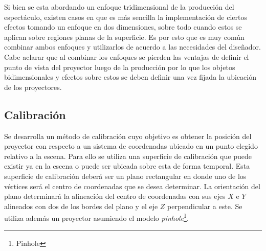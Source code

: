 Si bien se esta abordando un enfoque tridimensional de la producción del espectáculo, existen casos en que es más sencilla la implementación de ciertos efectos tomando un enfoque en dos dimensiones, sobre todo cuando estos se aplican sobre regiones planas de la superficie. Es por esto que es muy común combinar ambos enfoques y utilizarlos de acuerdo a las necesidades del diseñador. Cabe aclarar que al combinar los enfoques se pierden las ventajas de definir el punto de vista del proyector luego de la producción por lo que los objetos bidimensionales y efectos sobre estos se deben definir una vez fijada la ubicación de los proyectores.

\subsection{Calibración}
Se desarrolla un método de calibración cuyo objetivo es obtener la posición del proyector con respecto a un sistema de coordenadas ubicado en un punto elegido relativo a la escena. Para ello se utiliza una superficie de calibración que puede existir ya en la escena o puede ser ubicada sobre esta de forma temporal. Esta superficie de calibración deberá ser un plano rectangular en donde uno de los vértices será el centro de coordenadas que se desea determinar. La orientación del plano determinará la alineación del centro de coordenadas con sus ejes $X$ e $Y$ alineados con dos de los bordes del plano y el eje $Z$ perpendicular a este. Se utiliza además un proyector asumiendo el modelo \emph{pinhole}\footnote{Pinhole}.

